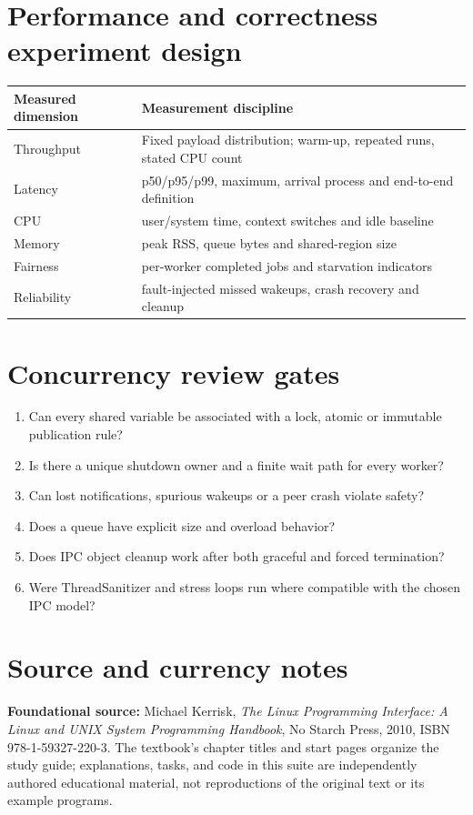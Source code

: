 \documentclass[11pt,letterpaper,oneside]{report}
\begin{document}
\chapter{Performance and correctness experiment design}
\begin{longtable}{p{.28\linewidth}p{.59\linewidth}}\toprule
Measured dimension & Measurement discipline\\\midrule\endhead
Throughput & Fixed payload distribution; warm-up, repeated runs, stated CPU count\\
Latency & p50/p95/p99, maximum, arrival process and end-to-end definition\\
CPU & user/system time, context switches and idle baseline\\
Memory & peak RSS, queue bytes and shared-region size\\
Fairness & per-worker completed jobs and starvation indicators\\
Reliability & fault-injected missed wakeups, crash recovery and cleanup\\
\bottomrule\end{longtable}\chapter{Concurrency review gates}
\begin{enumerate}
\item Can every shared variable be associated with a lock, atomic or immutable publication rule?
\item Is there a unique shutdown owner and a finite wait path for every worker?
\item Can lost notifications, spurious wakeups or a peer crash violate safety?
\item Does a queue have explicit size and overload behavior?
\item Does IPC object cleanup work after both graceful and forced termination?
\item Were ThreadSanitizer and stress loops run where compatible with the chosen IPC model?
\end{enumerate}

\chapter*{Source and currency notes}
\textbf{Foundational source:} Michael Kerrisk, \emph{The Linux Programming Interface: A Linux and UNIX System Programming Handbook}, No Starch Press, 2010, ISBN 978-1-59327-220-3. The textbook's chapter titles and start pages organize the study guide; explanations, tasks, and code in this suite are independently authored educational material, not reproductions of the original text or its example programs.
\end{document}

